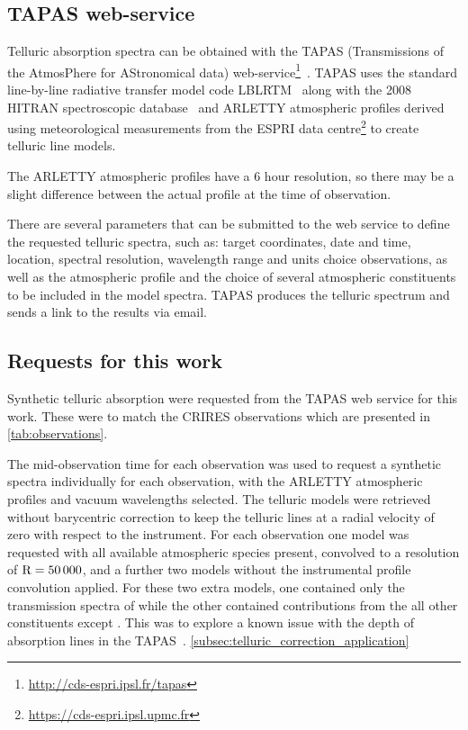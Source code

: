 

\subsection{TAPAS web-service}
\label{subsubsec:TAPAS}

Telluric absorption spectra can be obtained with the {TAPAS} (Transmissions of the AtmosPhere for AStronomical data) web-service\footnote{\href{http://cds-espri.ipsl.fr/tapas}{http://cds-espri.ipsl.fr/tapas}}~\citep{bertaux_tapas_2014}.
{TAPAS} uses the standard line-by-line radiative transfer model code LBLRTM~\citep{clough_linebyline_1995} along with the 2008 {HITRAN} spectroscopic database~\citep{rothman_hitran_2009} and {ARLETTY} atmospheric profiles derived using meteorological measurements from the ESPRI data centre\footnote{\href{https://cds-espri.ipsl.upmc.fr}{https://cds-espri.ipsl.upmc.fr}} to create telluric line models.

The {ARLETTY} atmospheric profiles have a 6 hour resolution, so there may be a slight difference between the actual profile at the time of observation.

There are several parameters that can be submitted to the web service to define the requested telluric spectra, such as: target coordinates, date and time, location, spectral resolution, wavelength range and units choice observations, as well as the atmospheric profile and the choice of several atmospheric constituents to be included in the model spectra. TAPAS produces the telluric spectrum and sends a link to the results via email. 


\subsection{Requests for this work}
Synthetic telluric absorption were requested from the TAPAS web service for this work.
These were to match the CRIRES observations which are presented in \cref{tab:observations}.
 
The mid-observation time for each observation was used to request a synthetic spectra individually for each observation, with the {ARLETTY} atmospheric profiles and vacuum wavelengths selected.
The telluric models were retrieved without barycentric correction to keep the telluric lines at a radial velocity of zero with respect to the instrument.
For each observation one model was requested with all available atmospheric species present, convolved to a resolution of \(\rm R=50\,000\), and a further two models without the instrumental profile convolution applied.
For these two extra models, one contained only the transmission spectra of  while the other contained contributions from the all other constituents except .
This was to explore a known issue with the depth of  absorption lines in the {TAPAS}~\citet{bertaux_tapas_2014}. \cref{subsec:telluric_correction_application}


